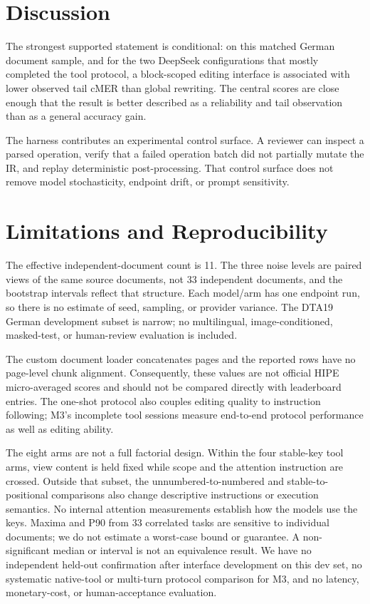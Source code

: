 \documentclass{article}
\begin{document}
\section{Discussion}
The strongest supported statement is conditional: on this matched German document sample, and for the two DeepSeek configurations that mostly completed the tool protocol, a block-scoped editing interface is associated with lower observed tail cMER than global rewriting. The central scores are close enough that the result is better described as a reliability and tail observation than as a general accuracy gain.

The harness contributes an experimental control surface. A reviewer can inspect a parsed operation, verify that a failed operation batch did not partially mutate the IR, and replay deterministic post-processing. That control surface does not remove model stochasticity, endpoint drift, or prompt sensitivity.

\section{Limitations and Reproducibility}
The effective independent-document count is 11. The three noise levels are paired views of the same source documents, not 33 independent documents, and the bootstrap intervals reflect that structure. Each model/arm has one endpoint run, so there is no estimate of seed, sampling, or provider variance. The DTA19 German development subset is narrow; no multilingual, image-conditioned, masked-test, or human-review evaluation is included.

The custom document loader concatenates pages and the reported rows have no page-level chunk alignment. Consequently, these values are not official HIPE micro-averaged scores and should not be compared directly with leaderboard entries. The one-shot protocol also couples editing quality to instruction following; M3's incomplete tool sessions measure end-to-end protocol performance as well as editing ability.

The eight arms are not a full factorial design. Within the four stable-key tool arms, view content is held fixed while scope and the attention instruction are crossed. Outside that subset, the unnumbered-to-numbered and stable-to-positional comparisons also change descriptive instructions or execution semantics. No internal attention measurements establish how the models use the keys. Maxima and P90 from 33 correlated tasks are sensitive to individual documents; we do not estimate a worst-case bound or guarantee. A non-significant median or interval is not an equivalence result. We have no independent held-out confirmation after interface development on this dev set, no systematic native-tool or multi-turn protocol comparison for M3, and no latency, monetary-cost, or human-acceptance evaluation.
\end{document}
